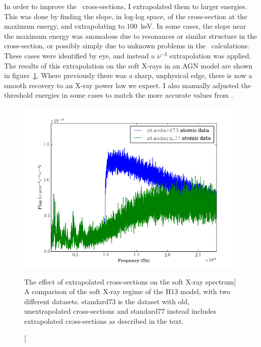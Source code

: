 In order to improve the \top\ cross-sections, I extrapolated them to larger
energies. This was done by finding the slope, in log-log space,
of the cross-section at the maximum energy, and extrapolating to $100$~keV.
In some cases, the slope near the maximum energy was anomalous 
due to resonances or similar structure in the cross-section, or possibly
simply due to unknown problems in the \top\ calculations. These
cases were identified by eye, and instead a $\nu^{-3}$ extrapolation
was applied. The results of this extrapolation on the soft X-rays in an AGN model
are shown in figure~\ref{fig:xs}. Where previously there was a sharp,
unphysical edge, there is now a smooth recovery to an X-ray 
power law we expect. I also manually adjusted the threshold energies in some
cases to match the more accurate values from \cite{vfky}.

\begin{figure}
\centering
\includegraphics[width=1.0\textwidth]{figures/03-radtrans/xs.png}
\caption
[The effect of extrapolated cross-sections on the soft X-ray spectrum]
{
A comparison of the soft X-ray regime of the H13 model, with two different
datasets. standard73 is the dataset with old, unextrapolated cross-sections 
and standard77 instead includes extrapolated cross-sections as described in
the text.
}
\label{fig:xs}
\end{figure}



